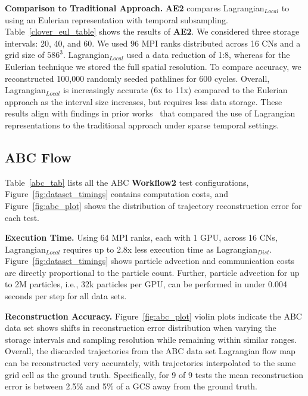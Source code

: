 
\textbf{Comparison to Traditional Approach.}
\textbf{AE2} compares Lagrangian$_{Local}$ to using an Eulerian representation with temporal subsampling.
%
Table~\ref{clover_eul_table} shows the results of \textbf{AE2}.
%
We considered three storage intervals: 20, 40, and 60.
%
We used 96 MPI ranks distributed across 16 CNs and a grid size of $586^3$.
%
Lagrangian$_{Local}$ used a data reduction of 1:8, whereas for the Eulerian technique we stored the full spatial resolution.
%
To compare accuracy, we reconstructed 100,000 randomly seeded pathlines for 600 cycles.
%
%
Overall, Lagrangian$_{Local}$ is increasingly accurate (6x to 11x) compared to the Eulerian approach as the interval size increases, but requires less data storage.
%
These results align with findings in prior works~\cite{agranovsky2014improved, sane2018revisiting} that compared the use of Lagrangian representations to the traditional approach under sparse temporal settings.


\subsection{ABC Flow}
\label{sec:abc}

Table~\ref{abc_tab} lists all the ABC \textbf{Workflow2} test configurations, Figure~\ref{fig:dataset_timings} contains computation costs, and Figure~\ref{fig:abc_plot} shows the distribution of trajectory reconstruction error for each test.
%



\textbf{Execution Time.} Using 64 MPI ranks, each with 1 GPU, across 16 CNs, Lagrangian$_{Local}$ requires up to 2.8x less execution time as Lagrangian$_{Dist}$.
%
Figure~\ref{fig:dataset_timings} shows particle advection and communication costs are directly proportional to the particle count.
%
Further, particle advection for up to 2M particles, i.e., 32k particles per GPU, can be performed in under 0.004 seconds per step for all data sets.
%


\textbf{Reconstruction Accuracy.} Figure~\ref{fig:abc_plot} violin plots indicate the ABC data set shows shifts in reconstruction error distribution when varying the storage intervals and sampling resolution while remaining within similar ranges.
%
Overall, the discarded trajectories from the ABC data set Lagrangian flow map can be reconstructed very accurately, with trajectories interpolated to the same grid cell as the ground truth.
%
Specifically, for 9 of 9 tests the mean reconstruction error is between 2.5\% and 5\% of a GCS away from the ground truth.
%

